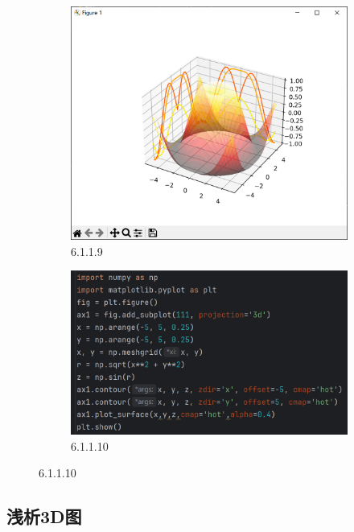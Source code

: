 \documentclass[12pt]{article}
\begin{document}
\begin{figure}[H]
    \centering
    \begin{subfigure}[b]{0.48\textwidth}
        \includegraphics[width=\textwidth]{3D exap Pic5.png} %
        \caption{6.1.1.9}
        \label{fig:line-graph2}
    \end{subfigure}
    \hfill
    \begin{subfigure}[b]{0.48\textwidth}
        \includegraphics[width=\textwidth]{3D exap program5.png} %
        \caption{6.1.1.10}
        \label{fig:line-graph2-pic2}
    \end{subfigure}
\end{figure}

\subsection{浅析3D图}
\end{document}
